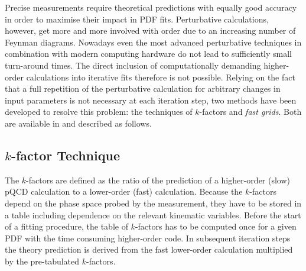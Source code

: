 Precise measurements
require theoretical predictions with equally good accuracy in
order to maximise their impact in PDF fits.  Perturbative
calculations, however, get more and more involved with 
order due to an increasing number of Feynman diagrams.
Nowadays even the most advanced perturbative techniques in
combination with modern computing hardware do not lead to sufficiently
small turn-around times. The direct inclusion of computationally
demanding higher-order calculations into iterative fits therefore is
not possible. Relying on the fact that a full repetition of the
perturbative calculation for arbitrary changes in input parameters is
not necessary at each iteration step, two methods have been developed
to resolve this problem: the techniques of $k$-factors and
\emph{fast grids}. Both are available in \fitter and described as follows.

\subsection{$k$-factor Technique}
  The $k$-factors are defined as the ratio of the prediction of a
  higher-order (slow) pQCD calculation to a lower-order (fast)
  calculation. Because the $k$-factors depend on the phase space
  probed by the measurement, they have to be stored in a table 
including dependence on
  the relevant kinematic variables. Before the start of
  a fitting procedure, the table of $k$-factors has to be computed once
  for a given PDF with the time consuming higher-order code. In
  subsequent iteration steps the theory prediction is derived from the
  fast lower-order calculation multiplied by the pre-tabulated
  $k$-factors.

